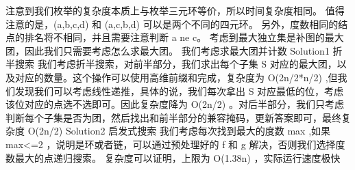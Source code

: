 {}注意到我们枚举的复杂度本质上与枚举三元环等价，所以时间复杂度相同。\markdownRendererParagraphSeparator
{}值得注意的是，\markdownRendererDollarSign{}(a,b,c,d)\markdownRendererDollarSign{} 和 \markdownRendererDollarSign{}(a,c,b,d)\markdownRendererDollarSign{} 可以是两个不同的四元环。\markdownRendererParagraphSeparator
{}另外，度数相同的结点的排名将不相同，并且需要注意判断 \markdownRendererDollarSign{}a \markdownRendererBackslash{}ne c\markdownRendererDollarSign{}。\markdownRendererInterblockSeparator
{}\markdownRendererInterblockSeparator
{}
\markdownRendererSectionEnd 
\markdownRendererSectionEnd \markdownRendererSectionBegin
{}\markdownRendererInterblockSeparator
{}考虑到最大独立集是补图的最大团，因此我们只需要考虑怎么求最大团。\markdownRendererParagraphSeparator
{}我们考虑求最大团并计数\markdownRendererParagraphSeparator
{}\markdownRendererDollarSign{} Solution1 \markdownRendererDollarSign{}折半搜索\markdownRendererParagraphSeparator
{}我们考虑折半搜索，对前半部分，我们求出每个子集\markdownRendererDollarSign{} S \markdownRendererDollarSign{}对应的最大团，以及对应的数量。这个操作可以使用高维前缀和完成，复杂度为\markdownRendererDollarSign{} O(2\markdownRendererCircumflex{}\markdownRendererLeftBrace{}n/2\markdownRendererRightBrace{}*\markdownRendererLeftBrace{}n/2\markdownRendererRightBrace{}) \markdownRendererDollarSign{},但我们发现我们可以考虑线性递推，具体的说，我们每次拿出\markdownRendererDollarSign{} S \markdownRendererDollarSign{}对应最低的位，考虑该位对应的点选不选即可。因此复杂度降为\markdownRendererDollarSign{} O(2\markdownRendererCircumflex{}\markdownRendererLeftBrace{}n/2\markdownRendererRightBrace{}) \markdownRendererDollarSign{}。对后半部分，我们只考虑判断每个子集是否为团，然后找出和前半部分的兼容掩码，更新答案即可，最终复杂度\markdownRendererDollarSign{} O(2\markdownRendererCircumflex{}\markdownRendererLeftBrace{}n/2\markdownRendererRightBrace{}) \markdownRendererDollarSign{}\markdownRendererInterblockSeparator
{}\markdownRendererInterblockSeparator
{}\markdownRendererDollarSign{} Solution2 \markdownRendererDollarSign{} 启发式搜索\markdownRendererParagraphSeparator
{}我们考虑每次找到最大的度数\markdownRendererDollarSign{} max\markdownRendererSoftLineBreak
{}\markdownRendererDollarSign{},如果\markdownRendererDollarSign{} max<=2 \markdownRendererDollarSign{}，说明是环或者链，可以通过预处理好的\markdownRendererDollarSign{} f \markdownRendererDollarSign{}和\markdownRendererDollarSign{} g \markdownRendererDollarSign{}解决，否则我们选择度数最大的点递归搜索。\markdownRendererParagraphSeparator
{}复杂度可以证明，上限为\markdownRendererDollarSign{} O(\markdownRendererLeftBrace{}1.38\markdownRendererRightBrace{}\markdownRendererCircumflex{}\markdownRendererLeftBrace{}n\markdownRendererRightBrace{}) \markdownRendererDollarSign{}，实际运行速度极快\markdownRendererInterblockSeparator
{}
\markdownRendererSectionEnd 
\markdownRendererSectionEnd \markdownRendererDocumentEnd
